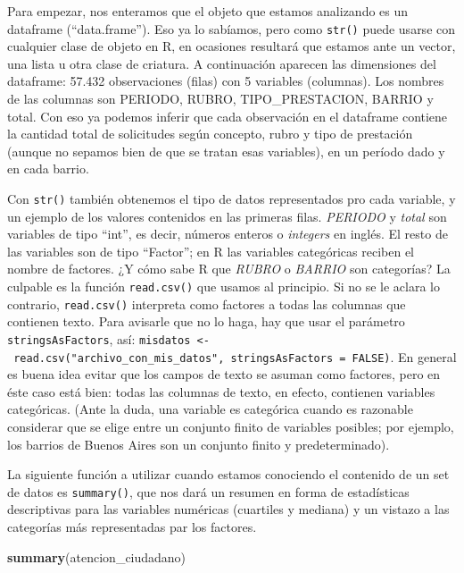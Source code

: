 \documentclass[spanish,]{book}
\newenvironment{Shaded}{\begin{snugshade}}{\end{snugshade}}
\newcommand{\KeywordTok}[1]{\textcolor[rgb]{0.13,0.29,0.53}{\textbf{#1}}}
\newcommand{\NormalTok}[1]{#1}
\begin{document}
Para empezar, nos enteramos que el objeto que estamos analizando es un dataframe (``data.frame''). Eso ya lo sabíamos, pero como \texttt{str()} puede usarse con cualquier clase de objeto en R, en ocasiones resultará que estamos ante un vector, una lista u otra clase de criatura. A continuación aparecen las dimensiones del dataframe: 57.432 observaciones (filas) con 5 variables (columnas). Los nombres de las columnas son PERIODO, RUBRO, TIPO\_PRESTACION, BARRIO y total. Con eso ya podemos inferir que cada observación en el dataframe contiene la cantidad total de solicitudes según concepto, rubro y tipo de prestación (aunque no sepamos bien de que se tratan esas variables), en un período dado y en cada barrio.

Con \texttt{str()} también obtenemos el tipo de datos representados pro cada variable, y un ejemplo de los valores contenidos en las primeras filas. \emph{PERIODO} y \emph{total} son variables de tipo ``int'', es decir, números enteros o \emph{integers} en inglés. El resto de las variables son de tipo ``Factor''; en R las variables categóricas reciben el nombre de factores. ¿Y cómo sabe R que \emph{RUBRO} o \emph{BARRIO} son categorías? La culpable es la función \texttt{read.csv()} que usamos al principio. Si no se le aclara lo contrario, \texttt{read.csv()} interpreta como factores a todas las columnas que contienen texto. Para avisarle que no lo haga, hay que usar el parámetro \texttt{stringsAsFactors}, así: \texttt{misdatos\ \textless{}-\ read.csv("archivo\_con\_mis\_datos",\ stringsAsFactors\ =\ FALSE)}. En general es buena idea evitar que los campos de texto se asuman como factores, pero en éste caso está bien: todas las columnas de texto, en efecto, contienen variables categóricas. (Ante la duda, una variable es categórica cuando es razonable considerar que se elige entre un conjunto finito de variables posibles; por ejemplo, los barrios de Buenos Aires son un conjunto finito y predeterminado).

La siguiente función a utilizar cuando estamos conociendo el contenido de un set de datos es \texttt{summary()}, que nos dará un resumen en forma de estadísticas descriptivas para las variables numéricas (cuartiles y mediana) y un vistazo a las categorías más representadas par los factores.

\begin{Shaded}
\begin{Highlighting}[]
\KeywordTok{summary}\NormalTok{(atencion_ciudadano)}
\end{Highlighting}
\end{Shaded}
\end{document}
